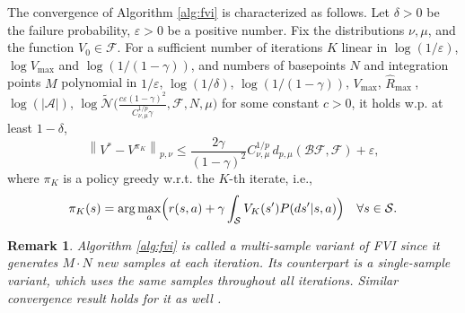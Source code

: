 \documentclass{article}
\numberwithin{equation}{section}
\newtheorem{remark}{Remark}
\newcommand{\cS}{\mathcal{S}}
\begin{document}
The convergence of Algorithm \ref{alg:fvi} is characterized as follows. Let \(\delta>0\) be the failure probability, \(\varepsilon>0\) be a positive number. Fix the distributions \(\nu, \mu\), and the function $V_0 \in \mathcal{F}$.
For a sufficient number of iterations \(K\) linear in $\log (1 / \varepsilon)$, $\log V_{\text {max}}$ and $\log (1 /(1-\gamma))$,
and numbers of basepoints \(N\) and integration points \(M\) polynomial in $1 / \varepsilon$, $\log (1 / \delta)$, $\log (1 /(1-\gamma))$, $V_{\text {max}}$, $\hat{R}_{\text {max }}$, $\log (|\mathcal{A}|)$, $\log \tilde{\mathcal{N}}\bigl(\frac{c \varepsilon(1-\gamma)^2}{C_{\nu, \mu}^{1 / p} \gamma}, \mathcal{F}, N, \mu\bigr)$ for some constant $c>0$, it holds w.p. at least $1-\delta$,
$$
\left\|V^*-V^{\pi_K}\right\|_{p, \nu} \leq \frac{2 \gamma}{(1-\gamma)^2} C_{\nu, \mu}^{1 / p}\, d_{p, \mu}(\mathcal{B} \mathcal{F}, \mathcal{F})+\varepsilon,
$$
where $\pi_K$ is a policy greedy w.r.t. the $K$-th iterate, i.e.,
\begin{equation*}
    \pi_K(s) = \arg\max_a \Bigl( r(s, a) + \gamma \int_{\cS} V_K(s') P(ds'|s,a) \Bigr)\quad \forall s\in\cS.
\end{equation*}
\begin{remark}
    Algorithm \ref{alg:fvi} is called a \emph{multi-sample} variant of FVI since it generates $M \cdot N$ new samples at each iteration. Its counterpart is a \emph{single-sample} variant, which uses the same samples throughout all iterations. Similar convergence result holds for it as well \citep{munos2008finite}.
\end{remark}
\end{document}
